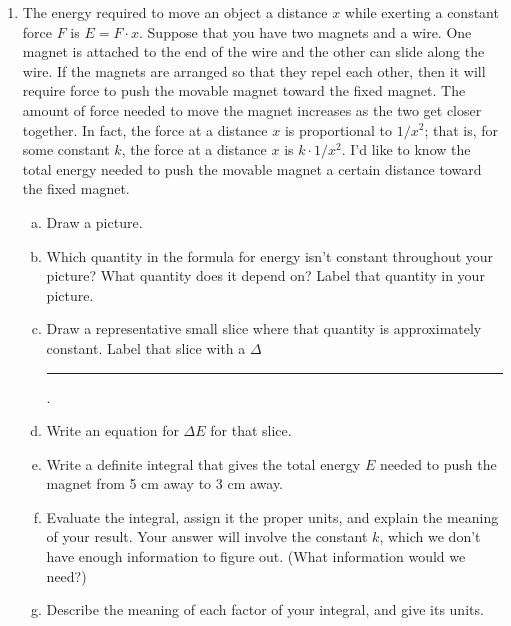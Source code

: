 \documentclass[12pt]{article}
\begin{document}
\begin{enumerate}
\item The energy required to move an object a distance \(x\) while exerting a constant force \(F\) is \(E = F\cdot x\).  Suppose that you have two magnets and a wire. One magnet is attached to the end of the wire and the other can slide along the wire. If the magnets are arranged so that they repel each other, then it will require force to push the movable magnet toward the fixed magnet. The amount of force needed to move the magnet increases as the two get closer together. In fact, the force at a distance \(x\) is proportional to \(1/x^2\); that is, for some constant $k$, the force at a distance $x$ is $k\cdot 1/x^2$. I'd like to know the total energy needed to push the movable magnet a certain distance toward the fixed magnet.
\begin{enumerate}[(a)]
    \item Draw a picture.
    \item Which quantity in the formula for energy isn't constant throughout your picture? What quantity does it depend on? Label that quantity in your picture.
    \item Draw a representative small slice where that quantity is approximately constant. Label that slice with a \(\Delta\)\rule{0.5cm}{0.15mm}.
    \item Write an equation for \(\Delta E\) for that slice.
    \item Write a definite integral that gives the total energy \(E\) needed to push the magnet from 5 cm away to 3 cm away. 
    \item Evaluate the integral, assign it the proper units, and explain the meaning of your result. Your answer will involve the constant \(k\), which we don't have enough information to figure out. (What information would we need?)
    \item Describe the meaning of each factor of your integral, and give its units.
\end{enumerate}


\end{enumerate}
\end{document}
